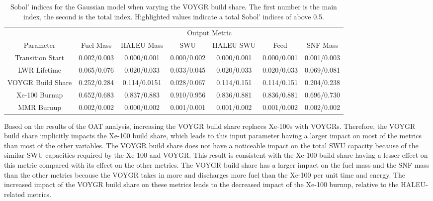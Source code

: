 \begin{table}[h!]
    \centering
    \caption{Sobol' indices for the Gaussian model when varying the VOYGR 
    build share. The first number is the main index, the second is the total 
    index. Highlighted 
    values indicate a total Sobol' indices of above 0.5.}
    \label{tab:s7_sobol_voygr_gaussian}
    \begin{tabular}{c c c c c c c}
        \hline
        & \multicolumn{6}{c}{Output Metric} \\
        Parameter & Fuel Mass & HALEU Mass & SWU & HALEU SWU & Feed & SNF Mass \\
        \hline
        Transition Start & 0.002/0.003 & 0.000/0.001 & 0.000/0.002 & 
                           0.000/0.001 & 0.000/0.001 & 0.001/0.003\\
        LWR Lifetime & 0.065/0.076 & 0.020/0.033 & 0.033/0.045 & 
                       0.020/0.033 & 0.020/0.033 & 0.069/0.081\\
        VOYGR Build Share & 0.252/0.284 & 0.114/0.0151 & 0.028/0.067 &
                            0.114/0.151 & 0.114/0.151 & 0.204/0.238\\
        Xe-100 Burnup & \cellcolor{green!25}0.652/0.683 & \cellcolor{green!25}0.837/0.883 & \cellcolor{green!25}0.910/0.956 & 
        \cellcolor{green!25}0.836/0.881 & \cellcolor{green!25}0.836/0.881 & \cellcolor{green!25}0.696/0.730\\
        MMR Burnup & 0.002/0.002 & 0.000/0.002 & 0.001/0.001 & 
                     0.001/0.002 & 0.001/0.002 & 0.002/0.002\\
        \hline        
    \end{tabular}
\end{table}

Based on the results of the \gls{OAT} analysis, increasing the VOYGR build 
share replaces 
Xe-100s with VOYGRs. Therefore, the VOYGR build share implicitly 
impacts the Xe-100 build share, which leads to this input parameter 
having a larger impact on most of the metrics than most of the other variables. 
The VOYGR build share does not have a noticeable impact on the 
total \gls{SWU} capacity because of the similar \gls{SWU} capacities 
required by the Xe-100 and VOYGR. This result is consistent with the 
Xe-100 build share having a lesser effect on this metric compared 
with its effect on the other metrics. 
The VOYGR build share has a larger impact on the fuel mass and the 
\gls{SNF} mass than the other metrics because the VOYGR takes in more 
and discharges more fuel than the Xe-100 per unit time and energy. 
The 
increased impact of the VOYGR build share on these metrics leads to 
the decreased impact of the Xe-100 burnup, relative to the 
\gls{HALEU}-related metrics. 


